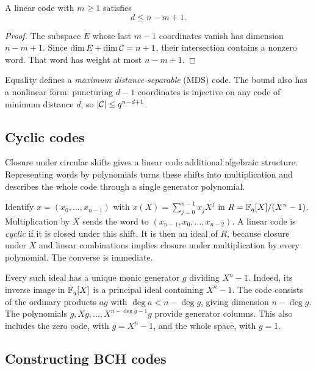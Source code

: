 
\begin{prop}
\label{prop-borne-singleton}
A linear code with $m\geq1$ satisfies
\begin{equation}
\label{eq-borne-singleton}
 d\leq n-m+1.
\end{equation}
\end{prop}
\begin{proof}
The subspace $E$ whose last $m-1$ coordinates vanish has dimension
$n-m+1$. Since $\dim E+\dim\mathcal{C}=n+1$, their intersection contains a
nonzero word. That word has weight at most $n-m+1$.
\end{proof}
Equality defines a \emph{maximum distance separable} (MDS) code.
The bound also has a nonlinear form: puncturing $d-1$ coordinates is
injective on any code of minimum distance $d$, so $|\mathcal{C}|\leq q^{n-d+1}$.

\subsection{Cyclic codes}
\label{sect2-cyclic-codes}

Closure under circular shifts gives a linear code additional algebraic
structure. Representing words by polynomials turns these shifts into
multiplication and describes the whole code through a single generator
polynomial.

Identify $x=(x_0,\ldots,x_{n-1})$ with
$x(X)=\sum_{j=0}^{n-1}x_jX^j$ in $R=\mathbb{F}_q[X]/(X^n-1)$.
Multiplication by $X$ sends the word to $(x_{n-1},x_0,\ldots,x_{n-2})$.
A linear code is \emph{cyclic} if it is closed under this shift.
It is then an ideal of $R$, because closure under $X$ and linear
combinations implies closure under multiplication by every polynomial.
The converse is immediate.

Every such ideal has a unique monic generator $g$ dividing $X^n-1$.
Indeed, its inverse image in $\mathbb{F}_q[X]$ is a principal ideal containing
$X^n-1$. The code consists of the ordinary products $ag$ with
$\deg a<n-\deg g$, giving dimension $n-\deg g$. The polynomials
$g,Xg,\ldots,X^{n-\deg g-1}g$ provide generator columns.
This also includes the zero code, with $g=X^n-1$, and the whole space,
with $g=1$.

\subsection{Constructing BCH codes}
\label{sect2-codes-BCH}

